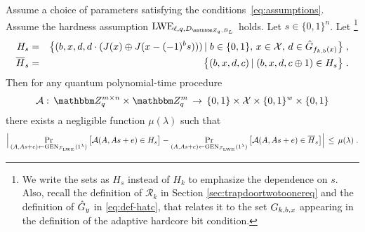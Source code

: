 \begin{lemma}\label{lem:lweadaptivehardcore} 
Assume a choice of parameters satisfying the conditions~\eqref{eq:assumptions}. Assume the hardness assumption $\lwe_{\ell,q,D_{\mZ_q,B_L}}$ holds. Let $s\in\{0,1\}^n$.  Let \footnote{We write the sets as $H_s$ instead of $H_k$ to emphasize the dependence on $s$. Also, recall the definition of $\mathcal{R}_k$ in Section \ref{sec:trapdoortwotoonereq} and the definition of $\hat{G}_{y}$ in \eqref{eq:def-hatc}, that relates it to the set $G_{k,b,x}$ appearing in the definition of the adaptive hardcore bit condition.}
\begin{eqnarray}
H_s &=& \big\{(b,x,d,d\cdot(\inj(x)\oplus \inj( x - (-1)^b \*s )))\,|\; b\in \{0,1\},\, x\in \sX,\, d\in \hat{\dset}_{f_{k,b}(x)}  \big\}\;,\label{eq:def-h}\\
\overline{H}_s &=& \big\{(b,x,d,c) \,|\; (b,x,d,c\oplus 1) \in H_s\big\}\;.
\end{eqnarray}
Then for any quantum polynomial-time procedure 
$$\mathcal{A}:\, \mZ_q^{m\times n} \times \mZ_q^m \,\to\,\{0,1\}\times \sX \times \{0,1\}^w \times\{0,1\}$$
 there exists a negligible function $\mu(\lambda)$ such that 
\begin{equation}\label{eq:lwebitattackeradvantage}
\Big|\Pr_{(\*A,\*A\*s+\*e)\leftarrow \textrm{GEN}_{\mathcal{F}_{\lwe}}(1^{\lambda})}\big[\mathcal{A}(\*A,\*A\*s+\*e) \in H_s\big] - \Pr_{(\*A,\*A\*s+\*e)\leftarrow \textrm{GEN}_{\mathcal{F}_{\lwe}}(1^{\lambda})}\big[\mathcal{A}(\*A,\*A\*s+\*e) \in \overline{H}_s\big]\Big| \,\leq\, \mu(\lambda)\;.
\end{equation} 
\end{lemma}

